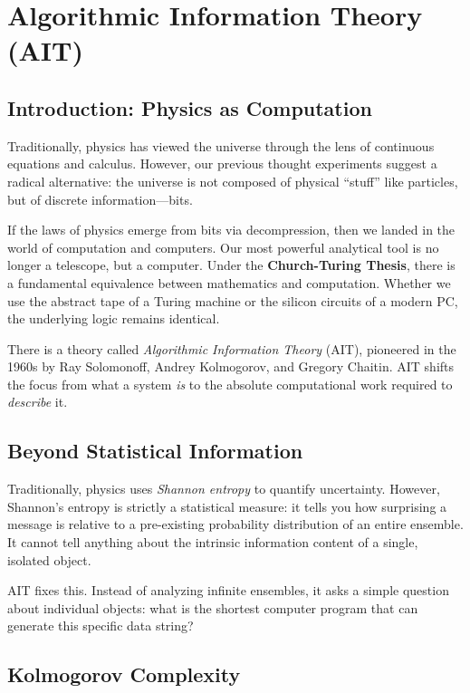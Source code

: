 \chapter{Algorithmic Information Theory (AIT)}
\label{chap:ait}

\section{Introduction: Physics as Computation}

Traditionally, physics has viewed the universe through the lens of continuous equations and calculus.
However, our previous thought experiments suggest a radical alternative: the universe is not composed of physical ``stuff'' like particles, but of discrete information—bits. 

If the laws of physics emerge from bits via decompression, then we landed in the world of computation and computers.
Our most powerful analytical tool is no longer a telescope, but a computer.
Under the \textbf{Church-Turing Thesis}, there is a fundamental equivalence between mathematics and computation.
Whether we use the abstract tape of a Turing machine or the silicon circuits of a modern PC, the underlying logic remains identical.

There is a theory called \emph{Algorithmic Information Theory} (AIT), pioneered in the 1960s by Ray Solomonoff, Andrey Kolmogorov, and Gregory Chaitin.
AIT shifts the focus from what a system \emph{is} to the absolute computational work required to \emph{describe} it. 

\section{Beyond Statistical Information}

Traditionally, physics uses \emph{Shannon entropy} to quantify uncertainty.
However, Shannon's entropy is strictly a statistical measure: it tells you how surprising a message is relative to a pre-existing probability distribution of an entire ensemble.
It cannot tell anything about the intrinsic information content of a single, isolated object.

AIT fixes this.
Instead of analyzing infinite ensembles, it asks a simple question about individual objects: what is the shortest computer program that can generate this specific data string?


\section{Kolmogorov Complexity}

